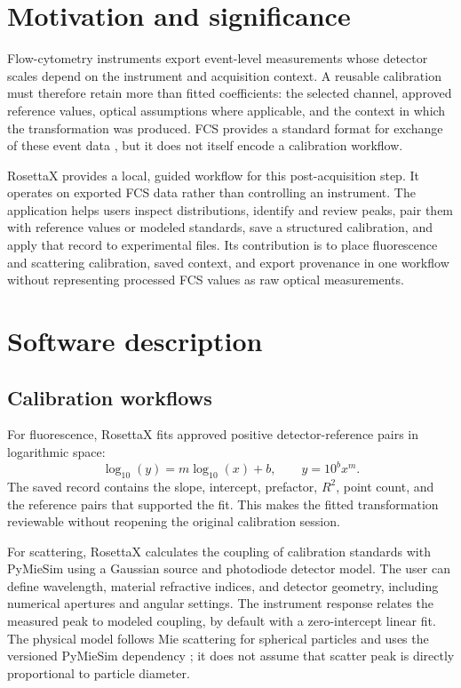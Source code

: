 \documentclass[preprint,12pt]{elsarticle}
\begin{document}
\section{Motivation and significance}

Flow-cytometry instruments export event-level measurements whose detector
scales depend on the instrument and acquisition context. A reusable
calibration must therefore retain more than fitted coefficients: the selected
channel, approved reference values, optical assumptions where applicable, and
the context in which the transformation was produced. FCS provides a standard
format for exchange of these event data \cite{Spidlen2010}, but it does not
itself encode a calibration workflow.

RosettaX provides a local, guided workflow for this post-acquisition step. It
operates on exported FCS data rather than controlling an instrument. The
application helps users inspect distributions, identify and review peaks, pair
them with reference values or modeled standards, save a structured calibration,
and apply that record to experimental files. Its contribution is to place
fluorescence and scattering calibration, saved context, and export provenance
in one workflow without representing processed FCS values as raw optical
measurements.

\section{Software description}

\subsection{Calibration workflows}

For fluorescence, RosettaX fits approved positive detector-reference pairs in
logarithmic space:
\begin{equation}
  \log_{10}(y) = m\log_{10}(x)+b,\qquad y=10^b x^m.
\end{equation}
The saved record contains the slope, intercept, prefactor, $R^2$, point count,
and the reference pairs that supported the fit. This makes the fitted
transformation reviewable without reopening the original calibration session.

For scattering, RosettaX calculates the coupling of calibration standards with
PyMieSim using a Gaussian source and photodiode detector model. The user can
define wavelength, material refractive indices, and detector geometry,
including numerical apertures and angular settings. The instrument response
relates the measured peak to modeled coupling, by default with a
zero-intercept linear fit. The physical model follows Mie scattering for
spherical particles \cite{Mie1908} and uses the versioned PyMieSim dependency
\cite{PyMieSim}; it does not assume that scatter peak is directly proportional
to particle diameter.
\end{document}
